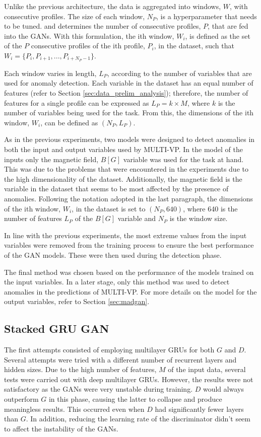 Unlike the previous architecture, the data is aggregated into windows, $W$, with consecutive profiles. The size of each window, $N_P$, is a hyperparameter that needs to be tuned. and determines the number of consecutive profiles, $P$, that are fed into the GANs. With this formulation, the ith window, $W_i$, is defined as the set of the $P$ consecutive profiles of the ith profile, $P_i$, in the dataset, such that $W_i = \{P_i, P_{i+1}, ..., P_{i+N_P-1}\}$.

Each window varies in length, $L_P$, according to the number of variables that are used for anomaly detection. Each variable in the dataset has an equal number of features (refer to Section \ref{sec:data_prelim_analysis}); therefore, the number of features for a single profile can be expressed as $L_P=k\times M$, where $k$ is the number of variables being used for the task. From this, the dimensions of the ith window, $W_i$, can be defined as $(N_P, L_P)$.

As in the previous experiments, two models were designed to detect anomalies in both the input and output variables used by MULTI-VP. In the model of the inputs only the magnetic field, $B [G]$ variable was used for the task at hand. This was due to the problems that were encountered in the experiments due to the high dimensionality of the dataset. Additionally, the magnetic field is the variable in the dataset that seems to be most affected by the presence of anomalies. Following the notation adopted in the last paragraph, the dimensions of the ith window, $W_{i}$, in the dataset is set to $(N_P, 640)$, where 640 is the number of features $L_P$ of the $B [G]$ variable and $N_P$ is the window size.

In line with the previous experiments, the most extreme values from the input variables were removed from the training process to ensure the best performance of the GAN models. These were then used during the detection phase.

The final method was chosen based on the performance of the models trained on the input variables. In a later stage, only this method was used to detect anomalies in the predictions of MULTI-VP. For more details on the model for the output variables, refer to Section \ref{sec:madgan}.


\subsection{Stacked GRU GAN}
The first attempts consisted of employing multilayer GRUs for both $G$ and $D$. Several attempts were tried with a different number of recurrent layers and hidden sizes. Due to the high number of features, $M$ of the input data, several tests were carried out with deep multilayer GRUs. However, the results were not satisfactory as the GANs were very unstable during training. $D$ would always outperform $G$ in this phase, causing the latter to collapse and produce meaningless results. This occurred even when $D$ had significantly fewer layers than $G$. In addition, reducing the learning rate of the discriminator didn't seem to affect the instability of the GANs. 

